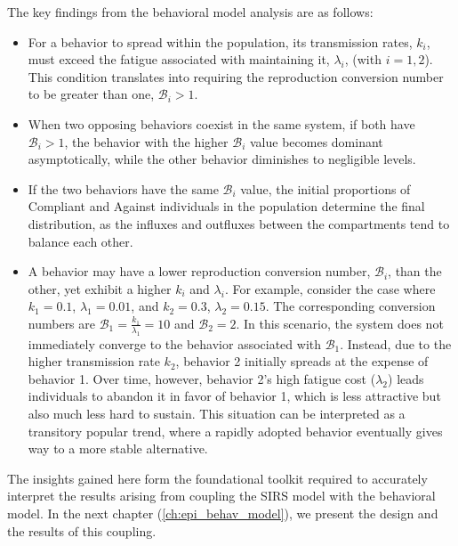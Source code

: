 The key findings from the behavioral model analysis are as follows:  
\begin{itemize}
	\item For a behavior to spread within the population, its transmission rates, \( k_i \), must exceed the fatigue associated with maintaining it, \( \lambda_i \), (with \( i = 1, 2 \)). This condition translates into requiring the reproduction conversion number to be greater than one, \( \mathcal{B}_i > 1 \).  
	\item When two opposing behaviors coexist in the same system, if both have \( \mathcal{B}_i > 1 \), the behavior with the higher \( \mathcal{B}_i \) value becomes dominant asymptotically, while the other behavior diminishes to negligible levels.  
	\item If the two behaviors have the same \( \mathcal{B}_i \) value, the initial proportions of Compliant and Against individuals in the population determine the final distribution, as the influxes and outfluxes between the compartments tend to balance each other.  
	\item A behavior may have a lower reproduction conversion number, \( \mathcal{B}_i \), than the other, yet exhibit a higher \( k_i \) and \( \lambda_i \). For example, consider the case where \( k_1 = 0.1 \), \( \lambda_1 = 0.01 \), and \( k_2 = 0.3 \), \( \lambda_2 = 0.15 \). The corresponding conversion numbers are \( \mathcal{B}_1 = \frac{k_1}{\lambda_1} = 10 \) and \( \mathcal{B}_2 = 2 \). In this scenario, the system does not immediately converge to the behavior associated with \( \mathcal{B}_1 \). Instead, due to the higher transmission rate \( k_2 \), behavior 2 initially spreads at the expense of behavior 1. Over time, however, behavior 2's high fatigue cost (\( \lambda_2 \)) leads individuals to abandon it in favor of behavior 1, which is less attractive but also much less hard to sustain. This situation can be interpreted as a transitory popular trend, where a rapidly adopted behavior eventually gives way to a more stable alternative.  
\end{itemize}  

The insights gained here form the foundational toolkit required to accurately interpret the results arising from coupling the SIRS model with the behavioral model. In the next chapter (\ref{ch:epi_behav_model}), we present the design and the results of this coupling.
